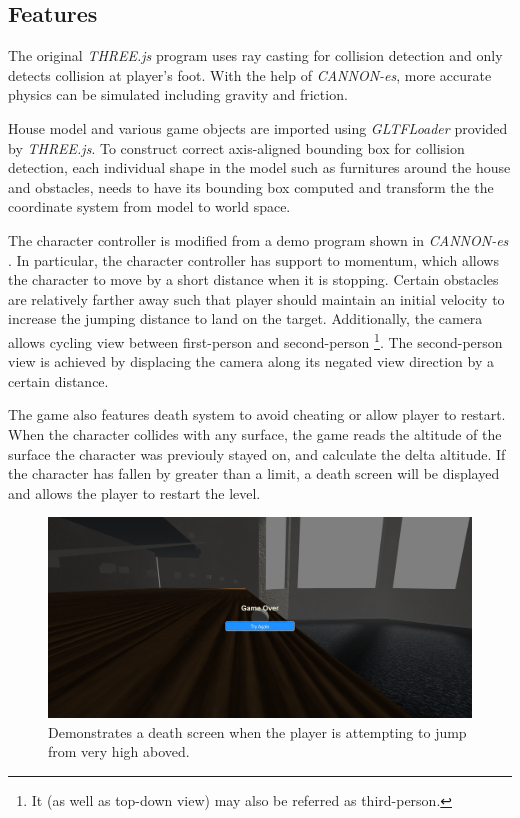 \documentclass[12pt, a4paper, oneside]{article}
\begin{document}
    \subsection{Features}

    The original \textit{THREE.js} program uses ray casting for collision detection and only detects collision at player's foot. With the help of \textit{CANNON-es}, more accurate physics can be simulated including gravity and friction.
    
    House model and various game objects are imported using \textit{GLTFLoader} provided by \textit{THREE.js}. To construct correct axis-aligned bounding box for collision detection, each individual shape in the model such as furnitures around the house and obstacles, needs to have its bounding box computed and transform the the coordinate system from model to world space.

    The character controller is modified from a demo program shown in \textit{CANNON-es} \cite{cannon_controller}. In particular, the character controller has support to momentum, which allows the character to move by a short distance when it is stopping. Certain obstacles are relatively farther away such that player should maintain an initial velocity to increase the jumping distance to land on the target. Additionally, the camera allows cycling view between first-person and second-person \footnote{It (as well as top-down view) may also be referred as third-person.}. The second-person view is achieved by displacing the camera along its negated view direction by a certain distance.

    The game also features death system to avoid cheating or allow player to restart. When the character collides with any surface, the game reads the altitude of the surface the character was previouly stayed on, and calculate the delta altitude. If the character has fallen by greater than a limit, a death screen will be displayed and allows the player to restart the level.

    \begin{figure}[H]
        \includegraphics[width=\textwidth]{death.png}
        \caption{Demonstrates a death screen when the player is attempting to jump from very high aboved.}
    \end{figure}
\end{document}
